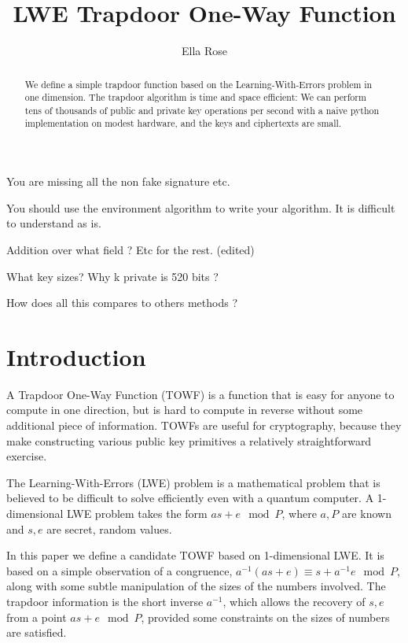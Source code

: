 \documentclass[preprint]{iacrtrans}
\author{Ella Rose}
\institute{Paso Robles, CA \email{python_pride@protonmail.com}}
\title[LWE Trapdoor One-Way Function]{LWE Trapdoor One-Way Function}
\begin{document}
\maketitle


\begin{abstract}
 We define a simple trapdoor function based on the Learning-With-Errors problem in one dimension. The trapdoor algorithm is time and space efficient: We can perform tens of thousands of public and private key operations per second with a naive python implementation on modest hardware, and the keys and ciphertexts are small.
 \end{abstract}

\todototoc
\listoftodos
You are missing all the non fake signature etc.

You should use the environment algorithm to write your algorithm. It is difficult to understand as is.

Addition over what field ? Etc for the rest. (edited)

What key sizes? Why k private is 520 bits ?

How does all this compares to others methods ?

\section{Introduction}
A Trapdoor One-Way Function (TOWF) is a function that is easy for anyone to compute in one direction, but is hard to compute in reverse without some additional piece of information. TOWFs are useful for cryptography, because they make constructing various public key primitives a relatively straightforward exercise.

The Learning-With-Errors (LWE) problem is a mathematical problem that is believed to be difficult to solve efficiently even with a quantum computer. A 1-dimensional LWE problem takes the form $a s + e \mod P$, where $a, P$ are known and $s, e$ are secret, random values.

In this paper we define a candidate TOWF based on 1-dimensional LWE. It is based on a simple observation of a congruence, $a^{-1}(a s + e) \equiv s + a^{-1} e \mod P$, along with some subtle manipulation of the sizes of the numbers involved. The trapdoor information is the short inverse $a^{-1}$, which allows the recovery of $s, e$ from a point $a s + e \mod P$, provided some constraints on the sizes of numbers are satisfied.
\end{document}
